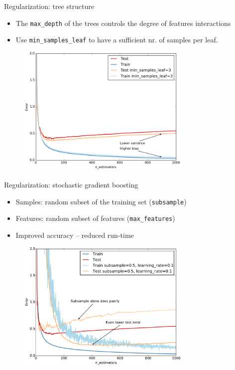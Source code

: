 \documentclass{beamer}
\begin{document}
\begin{frame}{Regularization: tree structure}

    \begin{itemize}
      \item The \texttt{max\_depth} of the trees controls the degree of features interactions
      \item Use \texttt{min\_samples\_leaf} to have a sufficient nr. of samples per leaf.
    \end{itemize}

   \begin{figure}
     \centering
       \includegraphics[width=0.75\textwidth]{figures/regularization-tree-structure.pdf}
   \end{figure}

\end{frame}



\begin{frame}{Regularization: stochastic gradient boosting}

    \begin{itemize}
      \item Samples: random subset of the training set (\texttt{subsample})
      \item Features: random subset of features (\texttt{max\_features})
      \item Improved accuracy -- reduced run-time
    \end{itemize}

   \begin{figure}
     \centering
       \includegraphics[width=0.75\textwidth]{figures/regularization-subsampling.pdf}
   \end{figure}

\end{frame}
\end{document}
